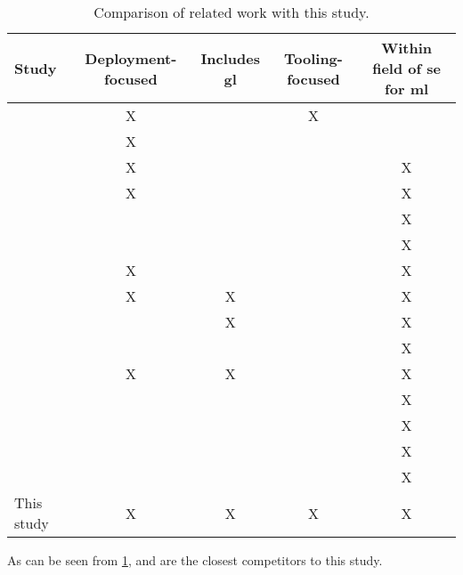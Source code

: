 \begin{table}[h]
\begin{adjustwidth}{-1in}{-1in}
    \centering
    \begin{tabular}{l c c c c}
        Study & Deployment-focused & Includes \acrshort{gl} & Tooling-focused & Within field of \acrshort{se} for \acrshort{ml} \\
        \hline
        \textcite{Shahin2017} & X & & X & \\
        \textcite{Rodriguez2017} & X & & & \\
        \textcite{Baier2019} & X & & & X \\
        \textcite{Paleyes2020} & X & & & X \\
        \textcite{Kumeno2020} & & & & X \\
        \textcite{Nascimento2020} & & & & X \\
        \textcite{Lwakatare2020} & X & & & X \\
        \textcite{Lwakatare2020a} & X & X & & X \\
        \textcite{Serban2020} & & X & & X \\
        \textcite{Karamitsos2020} & & & & X \\
        \textcite{John2021} & X & X & & X \\
        \textcite{Giray2021} & & & & X \\
        \textcite{Lorenzoni2021} & & & & X \\
        \textcite{MartinezFernandez2021} & & & & X \\
        \textcite{Serban2021} & & & & X \\
        This study & X & X & X & X \\
    \end{tabular}
    \caption{Comparison of related work with this study.}
    \label{tab:related_work_comparison}
\end{adjustwidth}
\end{table}

As can be seen from \cref{tab:related_work_comparison}, \cite{Lwakatare2020a} and \cite{John2021} are the closest competitors to this study.